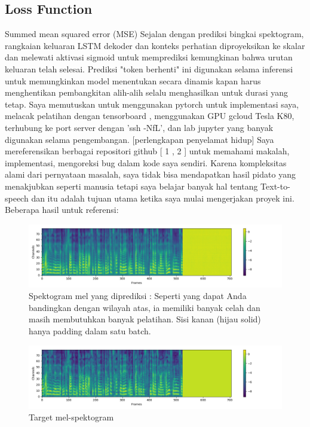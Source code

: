 \subsection{Loss Function}
Summed mean squared error (MSE)
Sejalan dengan prediksi bingkai spektogram, rangkaian keluaran LSTM dekoder dan konteks perhatian diproyeksikan ke skalar dan melewati aktivasi sigmoid untuk memprediksi kemungkinan bahwa urutan keluaran telah selesai. Prediksi "token berhenti" ini digunakan selama inferensi untuk memungkinkan model menentukan secara dinamis kapan harus menghentikan pembangkitan alih-alih selalu menghasilkan untuk durasi yang tetap.
Saya memutuskan untuk menggunakan pytorch untuk implementasi saya, melacak pelatihan dengan tensorboard , menggunakan GPU gcloud Tesla K80, terhubung ke port server dengan 'ssh -NfL', dan lab jupyter yang banyak digunakan selama pengembangan. [perlengkapan penyelamat hidup]
Saya mereferensikan berbagai repositori github [ 1 , 2 ] untuk memahami makalah, implementasi, mengoreksi bug dalam kode saya sendiri. Karena kompleksitas alami dari pernyataan masalah, saya tidak bisa mendapatkan hasil pidato yang menakjubkan seperti manusia tetapi saya belajar banyak hal tentang Text-to-speech dan itu adalah tujuan utama ketika saya mulai mengerjakan proyek ini.
Beberapa hasil untuk referensi:
\begin{figure}[H]
        \centerline{\includegraphics[scale=.75]{figures/ref1}}
        \caption{Spektogram mel yang diprediksi : Seperti yang dapat Anda bandingkan dengan wilayah atas, ia memiliki banyak celah dan masih membutuhkan banyak pelatihan. Sisi kanan (hijau solid) hanya padding dalam satu batch.}
		\label{ref1}
\end{figure}
\begin{figure}[H]
        \centerline{\includegraphics[scale=.75]{figures/ref2}}
        \caption{Target mel-spektogram}
		\label{ref2}
\end{figure}
